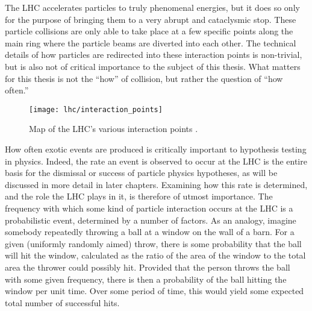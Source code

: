     The LHC accelerates particles to truly phenomenal energies, but it does so only for the purpose of bringing them to a very abrupt and cataclysmic stop.
    These particle collisions are only able to take place at a few specific points along the main ring where the particle beams are diverted into each other.
    The technical details of how particles are redirected into these interaction points is non-trivial, but is also not of critical importance to the subject of this thesis.
    What matters for this thesis is not the ``how'' of collision, but rather the question of ``how often.''

    \begin{figure}[h]
        \texttt{[image: lhc/interaction\_points]}
        \caption{Map of the LHC's various interaction points \cite{lhc_machine}.}
        \label{fig:interaction_points}
    \end{figure}

    \FloatBarrier

    How often exotic events are produced is critically important to hypothesis testing in physics.
    Indeed, the rate an event is observed to occur at the LHC is the entire basis for the dismissal or success of particle physics hypotheses,
        as will be discussed in more detail in later chapters.
    Examining how this rate is determined, and the role the LHC plays in it, is therefore of utmost importance.
    The frequency with which some kind of particle interaction occurs at the LHC is a probabilistic event, determined by a number of factors.
    As an analogy, imagine somebody repeatedly throwing a ball at a window on the wall of a barn.
    For a given (uniformly randomly aimed) throw, there is some probability that the ball will hit the window,
        calculated as the ratio of the area of the window to the total area the thrower could possibly hit.
    Provided that the person throws the ball with some given frequency, there is then a probability of the ball hitting the window per unit time.
    Over some period of time, this would yield some expected total number of successful hits.

    

